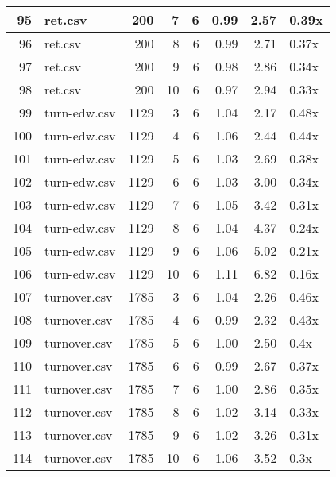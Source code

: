 \begin{table}[ht]
\begin{tabular}{rlrrrrrl}
   \hline
95 & ret.csv & 200 &   7 &   6 & 0.99 & 2.57 & 0.39x \\ 
   \hline
96 & ret.csv & 200 &   8 &   6 & 0.99 & 2.71 & 0.37x \\ 
   \hline
97 & ret.csv & 200 &   9 &   6 & 0.98 & 2.86 & 0.34x \\ 
   \hline
98 & ret.csv & 200 &  10 &   6 & 0.97 & 2.94 & 0.33x \\ 
   \hline
99 & turn-edw.csv & 1129 &   3 &   6 & 1.04 & 2.17 & 0.48x \\ 
   \hline
100 & turn-edw.csv & 1129 &   4 &   6 & 1.06 & 2.44 & 0.44x \\ 
   \hline
101 & turn-edw.csv & 1129 &   5 &   6 & 1.03 & 2.69 & 0.38x \\ 
   \hline
102 & turn-edw.csv & 1129 &   6 &   6 & 1.03 & 3.00 & 0.34x \\ 
   \hline
103 & turn-edw.csv & 1129 &   7 &   6 & 1.05 & 3.42 & 0.31x \\ 
   \hline
104 & turn-edw.csv & 1129 &   8 &   6 & 1.04 & 4.37 & 0.24x \\ 
   \hline
105 & turn-edw.csv & 1129 &   9 &   6 & 1.06 & 5.02 & 0.21x \\ 
   \hline
106 & turn-edw.csv & 1129 &  10 &   6 & 1.11 & 6.82 & 0.16x \\ 
   \hline
107 & turnover.csv & 1785 &   3 &   6 & 1.04 & 2.26 & 0.46x \\ 
   \hline
108 & turnover.csv & 1785 &   4 &   6 & 0.99 & 2.32 & 0.43x \\ 
   \hline
109 & turnover.csv & 1785 &   5 &   6 & 1.00 & 2.50 & 0.4x \\ 
   \hline
110 & turnover.csv & 1785 &   6 &   6 & 0.99 & 2.67 & 0.37x \\ 
   \hline
111 & turnover.csv & 1785 &   7 &   6 & 1.00 & 2.86 & 0.35x \\ 
   \hline
112 & turnover.csv & 1785 &   8 &   6 & 1.02 & 3.14 & 0.33x \\ 
   \hline
113 & turnover.csv & 1785 &   9 &   6 & 1.02 & 3.26 & 0.31x \\ 
   \hline
114 & turnover.csv & 1785 &  10 &   6 & 1.06 & 3.52 & 0.3x \\ 
   \hline
\end{tabular}
\end{table}
